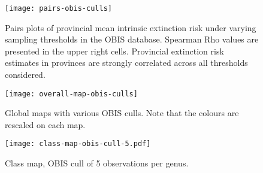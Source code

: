 \documentclass[11pt]{article}
\begin{document}
\clearpage

%


\clearpage

\begin{figure}[htbp]
\begin{center}
\texttt{[image: pairs-obis-culls]}
\caption{Pairs plots of provincial mean intrinsic extinction risk under varying sampling thresholds in the OBIS database. Spearman Rho values are presented in the upper right cells. Provincial extinction risk estimates in provinces are strongly correlated across all thresholds considered.}
\label{fig:pairs-prov-obis-culls}
\end{center}
\end{figure}

\clearpage

\begin{figure}[htbp]
\begin{center}
\texttt{[image: overall-map-obis-culls]}
\caption{Global maps with various OBIS culls. Note that the colours are rescaled on each map.}
\label{fig:overall-maps-obis-culls}
\end{center}
\end{figure}

\begin{figure}[htbp]
\begin{center}
  \texttt{[image: class-map-obis-cull-5.pdf]}
\caption{Class map, OBIS cull of 5 observations per genus.}
\label{fig:class-map-obis-cull-5}
\end{center}
\end{figure}
\end{document}

